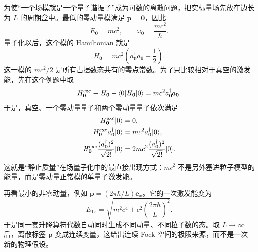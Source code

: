 \begin{exbox}[把一个场模真的当作谐振子来算]
为使“一个场模就是一个量子谐振子”成为可数的离散问题，把实标量场先放在边长为 $L$ 的周期盒中。最低的零动量模满足 $\mathbf p=\mathbf0$，因此
\begin{equation*}
 E_{\mathbf0}=mc^2,
 \qquad
 \omega_{\mathbf0}=\frac{mc^2}{\hbar}.
\end{equation*}
量子化以后，这个模的 Hamiltonian 就是
\begin{equation*}
 H_{\mathbf0}=mc^2\left(a_{\mathbf0}^\dagger a_{\mathbf0}+\frac12\right).
\end{equation*}
这一模的 $mc^2/2$ 是所有占据数态共有的零点常数。为了只比较相对于真空的激发能，先在这个例题中取
\begin{equation*}
 H_{\mathbf0}^{\rm exc}
 \equiv H_{\mathbf0}-\langle0|H_{\mathbf0}|0\rangle
 =mc^2a_{\mathbf0}^\dagger a_{\mathbf0}.
\end{equation*}
于是，真空、一个零动量量子和两个零动量量子依次满足
\begin{align*}
 H_{\mathbf0}^{\rm exc}|0\rangle&=0,\\
 H_{\mathbf0}^{\rm exc}a_{\mathbf0}^\dagger|0\rangle
 &=mc^2a_{\mathbf0}^\dagger|0\rangle,\\
 H_{\mathbf0}^{\rm exc}\frac{(a_{\mathbf0}^\dagger)^2}{\sqrt{2!}}|0\rangle
 &=2mc^2\frac{(a_{\mathbf0}^\dagger)^2}{\sqrt{2!}}|0\rangle.
\end{align*}
这就是“静止质量”在场量子化中的最直接出现方式：$mc^2$ 不是另外塞进粒子模型的能量，而是零动量正常模的单量子激发能。

再看最小的非零动量，例如 $\mathbf p=(2\pi\hbar/L)\mathbf e_x$。它的一次激发能变为
\begin{equation*}
 E_{1x}=\sqrt{m^2c^4+c^2\left(\frac{2\pi\hbar}{L}\right)^2}.
\end{equation*}
于是同一套升降算符代数自动同时生成不同动量、不同粒子数的态。取 $L\to\infty$ 后，离散标签 $\mathbf p$ 变成连续变量，这给出连续 Fock 空间的极限来源，而不是一次新的物理假设。
\end{exbox}

